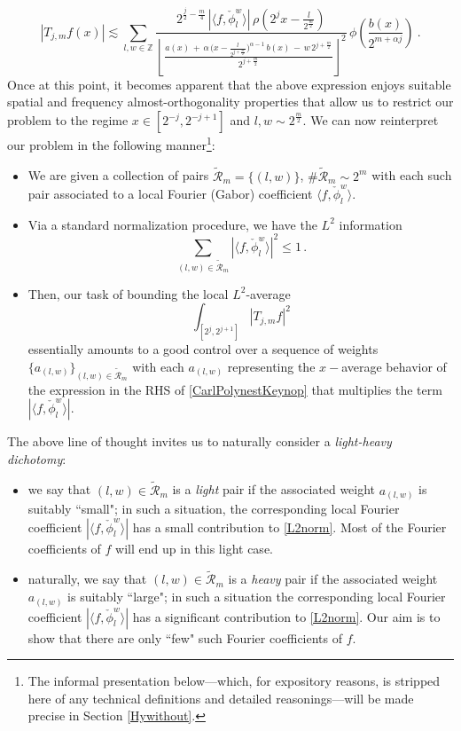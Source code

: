 \documentclass[a4paper,reqno]{amsart}
\numberwithin{equation}{section}
\theoremstyle{definition}
\newcommand{\Z}{\mathbb{Z}}
\def\a{\alpha}
\def\r{\mathcal{R}}
\begin{document}
\begin{equation}\label{CarlPolynestKeynop}
	|T_{j,m} f(x)|\lesssim \sum_{l,w\in\Z} \frac{2^{\frac{j}{2}-\frac{m}{4}}\,|\langle f,  \check{\phi}_{l}^w\rangle|\,\rho(2^{j}x-\frac{l}{2^{\frac{m}{2}}})}
	{\left\lfloor\frac{a(x)\,+\,\a\,\big(x-\frac{l}{2^{j+\frac{m}{2}}}\big)^{\a-1}\,b(x)\,-\,w\,2^{j+\frac{m}{2}}}{2^{j+\frac{m}{2}}}\right\rfloor^2}\,
	\phi\left(\frac{b(x)}{2^{m+\a j}}\right)\:.
\end{equation}
Once at this point, it becomes apparent that the above expression enjoys suitable spatial and frequency almost-orthogonality properties that allow us to restrict our problem to the regime $x\in [2^{-j},2^{-j+1}]$ and  $l,w\sim 2^{\frac{m}{2}}$. We can now reinterpret our problem in the following manner\footnote{The informal presentation below---which, for expository reasons,  is stripped here of any technical definitions and detailed reasonings---will be made precise in Section \ref{Hywithout}.}:
\begin{itemize}
\item We are given a collection of pairs  $\tilde{\r}_m=\{(l,w)\}$, $\#\tilde{\r}_m\sim 2^m$ with each such pair associated to a local Fourier (Gabor) coefficient $\langle f,  \check{\phi}_{l}^w\rangle$.
\item Via a standard normalization procedure, we have the $L^2$ information
$$\sum_{(l,w)\in \tilde{\r}_m}|\langle f,  \check{\phi}_{l}^w\rangle|^2\leq 1\,.$$
\item Then, our task of bounding the local $L^2$-average
\begin{equation}\label{L2norm}
\int_{[2^j, 2^{j+1}]}|T_{j,m} f|^2
\end{equation}
essentially amounts to a good control over a sequence of weights $\{a_{(l,w)}\}_{(l,w)\in\tilde{\r}_m}$ with each $a_{(l,w)}$ representing the $x-$average behavior of the expression in the RHS of \eqref{CarlPolynestKeynop} that multiplies the term $|\langle f,  \check{\phi}_{l}^w\rangle|$.
\end{itemize}
The above line of thought invites us to naturally consider a \emph{light-heavy dichotomy}:
\begin{itemize}
\item we say that $(l,w)\in \tilde{\r}_m$ is a \emph{light} pair if the associated weight $a_{(l,w)}$ is suitably ``small"; in such a situation, the corresponding local Fourier coefficient $|\langle f,  \check{\phi}_{l}^w\rangle|$ has a small contribution to \eqref{L2norm}. Most of the Fourier coefficients of $f$ will end up in this light case.

\item naturally, we say that $(l,w)\in \tilde{\r}_m$ is a \emph{heavy} pair if the associated weight $a_{(l,w)}$ is suitably ``large"; in such a situation the corresponding local Fourier coefficient $|\langle f,  \check{\phi}_{l}^w\rangle|$ has a significant contribution to \eqref{L2norm}. Our aim is to show that there are only ``few" such Fourier coefficients of $f$.
\end{itemize}
\end{document}
